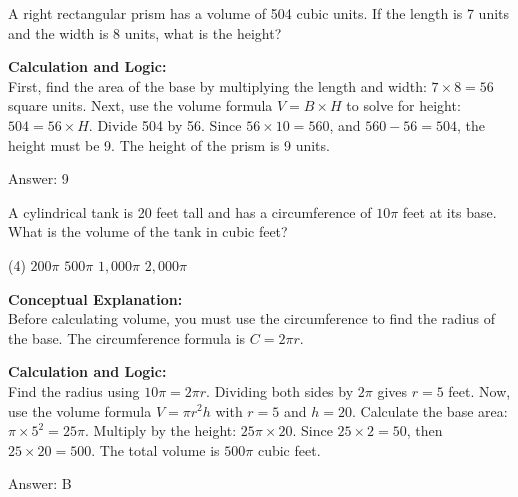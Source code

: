 \documentclass[11pt,paper=a4,answers]{exam}
\begin{document}
\begin{questions}
\question
A right rectangular prism has a volume of 504 cubic units. If the length is 7 units and the width is 8 units, what is the height?

\begin{solution}
\textbf{Calculation and Logic:} \\
First, find the area of the base by multiplying the length and width: $7 \times 8 = 56$ square units. Next, use the volume formula $V = B \times H$ to solve for height: $504 = 56 \times H$. Divide 504 by 56. Since $56 \times 10 = 560$, and $560 - 56 = 504$, the height must be 9. The height of the prism is 9 units.

\vspace{30pt}

Answer: \colorbox{yellow!100}{9}
\end{solution}

\vspace{60pt}

\question
A cylindrical tank is 20 feet tall and has a circumference of $10\pi$ feet at its base. What is the volume of the tank in cubic feet?
\begin{tasks}(4)
    \task $200\pi$
    \task $500\pi$
    \task $1,000\pi$
    \task $2,000\pi$
\end{tasks}

\begin{solution}
\textbf{Conceptual Explanation:} \\
Before calculating volume, you must use the circumference to find the radius of the base. The circumference formula is $C = 2\pi r$.

\vspace{30pt}

\textbf{Calculation and Logic:} \\
Find the radius using $10\pi = 2\pi r$. Dividing both sides by $2\pi$ gives $r = 5$ feet. Now, use the volume formula $V = \pi r^2 h$ with $r = 5$ and $h = 20$. Calculate the base area: $\pi \times 5^2 = 25\pi$. Multiply by the height: $25\pi \times 20$. Since $25 \times 2 = 50$, then $25 \times 20 = 500$. The total volume is $500\pi$ cubic feet.

\vspace{30pt}

Answer: \colorbox{yellow!100}{B}
\end{solution}


\end{questions}
\end{document}
